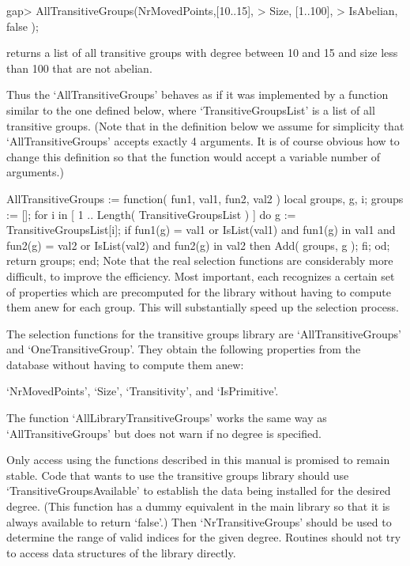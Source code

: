 \beginexample
gap> AllTransitiveGroups(NrMovedPoints,[10..15],
>                        Size,         [1..100],
>                        IsAbelian,    false    );
\endexample

returns a list of all transitive groups with degree between 10 and 15 and
size less than 100 that are not abelian.

Thus  the `AllTransitiveGroups'  behaves  as if   it was implemented  by a
function similar to the one defined below, where `TransitiveGroupsList' is a
list of all transitive groups.  (Note that in  the definition below we assume
for simplicity that `AllTransitiveGroups' accepts exactly 4 arguments.  It is
of course  obvious how to change this  definition so that the function would
accept a variable number of arguments.)

\begintt
AllTransitiveGroups := function( fun1, val1, fun2, val2 )
local    groups, g, i;
  groups := [];
  for i  in [ 1 .. Length( TransitiveGroupsList ) ] do
    g := TransitiveGroupsList[i];
    if      fun1(g) = val1  or IsList(val1) and fun1(g) in val1
        and fun2(g) = val2  or IsList(val2) and fun2(g) in val2
     then
      Add( groups, g );
    fi;
  od;
  return groups;
end;
\endtt
Note that the real  selection functions are considerably  more difficult,
to improve the efficiency. Most  important, each recognizes a certain set
of properties which are precomputed for the library without having to
compute them anew for each group. This will substantially speed up the
selection process.

The selection functions for the transitive
groups library are `AllTransitiveGroups' and `OneTransitiveGroup'. They
obtain the following properties from the database without having to compute
them anew:

`NrMovedPoints', `Size',   `Transitivity', and `IsPrimitive'.

The function `AllLibraryTransitiveGroups' works the same way as
`AllTransitiveGroups' but does not warn if no degree is specified.


Only access using the functions described in this manual is promised to
remain stable. Code that wants to use the transitive groups library should
use `TransitiveGroupsAvailable' to establish the data being installed for
the desired degree. (This function has a dummy equivalent in the main {\GAP}
library so that it is always available to return `false'.) Then
`NrTransitiveGroups' should be used to determine the range of valid indices for
the given degree. Routines should not try to access data structures of the
library directly.

